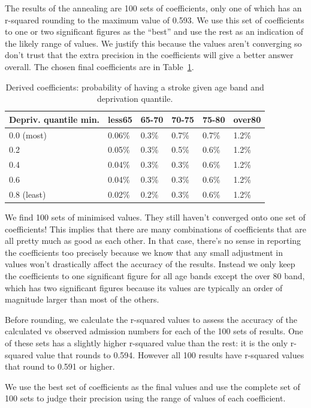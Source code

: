 \documentclass[12pt]{extarticle}
\begin{document}
The results of the annealing are 100 sets of coefficients, only one of which has an r-squared rounding to the maximum value of 0.593.
We use this set of coefficients to one or two significant figures as the ``best'' and use the rest as an indication of the likely range of values.
We justify this because the values aren't converging so don't trust that the extra precision in the coefficients will give a better answer overall.
The chosen final coefficients are in Table~\ref{tab:best_coeffs}.


\begin{table}
\centering
\caption{Derived coefficients: probability of having a stroke given age band and deprivation quantile.}
\begin{tabular}{llllll}
Depriv. quantile min. & less65 & 65-70 & 70-75 & 75-80 & over80 \\
\hline
0.0 (most) & 0.06\% & 0.3\% & 0.7\% & 0.7\% & 1.2\% \\
0.2 & 0.05\% & 0.3\% & 0.5\% & 0.6\% & 1.2\% \\
0.4 & 0.04\% & 0.3\% & 0.3\% & 0.6\% & 1.2\% \\
0.6 & 0.04\% & 0.3\% & 0.3\% & 0.6\% & 1.2\% \\
0.8 (least) & 0.02\% & 0.2\% & 0.3\% & 0.6\% & 1.2\% \\
\end{tabular}
\label{tab:best_coeffs}
\end{table}


We find 100 sets of minimised values.
They still haven't converged onto one set of coefficients!
This implies that there are many combinations of coefficients that are all pretty much as good as each other.
In that case, there's no sense in reporting the coefficients too precisely because we know that any small adjustment in values won't drastically affect the accuracy of the results. Instead we only keep the coefficients to one significant figure for all age bands except the over 80 band, which has two significant figures because its values are typically an order of magnitude larger than most of the others.

Before rounding, we calculate the r-squared values to assess the accuracy of the calculated vs observed admission numbers for each of the 100 sets of results.
One of these sets has a slightly higher r-squared value than the rest: it is the only r-squared value that rounds to 0.594.
However all 100 results have r-squared values that round to 0.591 or higher.

We use the best set of coefficients as the final values and use the complete set of 100 sets to judge their precision using the range of values of each coefficient.
\end{document}
